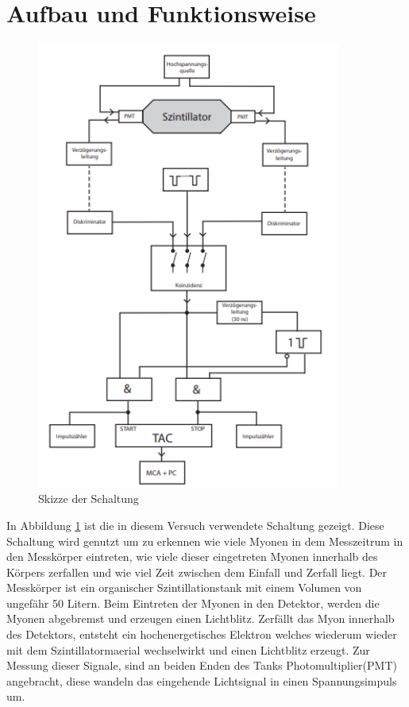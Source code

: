 \newpage
\section{Aufbau und Funktionsweise}
	
	\begin{figure}
		\includegraphics[width=10cm]{latex/images/Aufbau.png}
		\caption{Skizze der Schaltung \cite{Versuch}}
		\label{fig:Aufb}
	\end{figure}
    In Abbildung \ref{fig:Aufb} ist die in diesem Versuch verwendete Schaltung gezeigt.
    Diese Schaltung wird genutzt um zu erkennen wie viele Myonen in dem Messzeitrum in den Messkörper eintreten, wie viele dieser eingetreten Myonen innerhalb des Körpers zerfallen und wie viel Zeit zwischen dem Einfall und Zerfall liegt.
    Der Messkörper ist ein organischer Szintillationstank mit einem Volumen von ungefähr 50 Litern.
    Beim Eintreten der Myonen in den Detektor, werden die Myonen abgebremst und erzeugen einen Lichtblitz.
    Zerfällt das Myon innerhalb des Detektors, entsteht ein hochenergetisches Elektron welches wiederum wieder mit dem Szintillatormaerial wechselwirkt und einen Lichtblitz erzeugt.
    Zur Messung dieser Signale, sind an beiden Enden des Tanks Photomultiplier(PMT) angebracht, diese wandeln das eingehende Lichtsignal in einen Spannungsimpuls um. 

